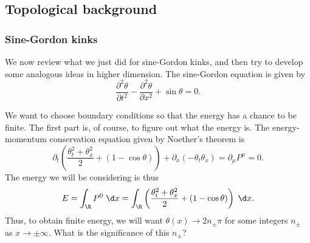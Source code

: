 \documentclass[a4paper]{article}
\begin{document}
\subsection{Topological background}
\subsubsection*{Sine-Gordon kinks}
We now review what we just did for sine-Gordon kinks, and then try to develop some analogous ideas in higher dimension. The sine-Gordon equation is given by
\[
  \frac{\partial^2 \theta}{\partial t^2} - \frac{\partial^2 \theta}{\partial x^2} + \sin \theta = 0.
\]

We want to choose boundary conditions so that the energy has a chance to be finite. The first part is, of course, to figure out what the energy is. The energy-momentum conservation equation given by Noether's theorem is
\[
  \partial_t \left(\frac{\theta_t^2 + \theta_x^2}{2} + (1 - \cos \theta)\right) + \partial_x (-\theta_t \theta_x) = \partial_\mu P^\mu = 0.
\]
The energy we will be considering is thus
\[
  E = \int_{\R} P^0 \;\d x = \int_\R \left(\frac{\theta_t^2 + \theta_x^2}{2} + (1 - \cos \theta)\right)\;\d x.
\]
Thus, to obtain finite energy, we will want $\theta(x) \to 2n_{\pm} \pi$ for some integers $n_{\pm}$ as $x \to \pm \infty$. What is the significance of this $n_{\pm}$?
\end{document}
